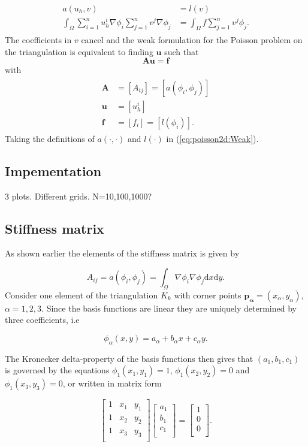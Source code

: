 \documentclass[paper=a4, fontsize=11pt]{scrartcl} %
\begin{document}
\begin{eqnarray}
\begin{aligned}
\nonumber
a(u_h,v) &= l(v) \\
\int_{\Omega}\sum\limits_{i=1}^n u^i_h\nabla\phi_i\sum\limits_{j=1}^n v^j\nabla\phi_j &= \int_{\Omega}f\sum\limits_{j=1}^n v^j\phi_j.
\end{aligned}
\end{eqnarray}
The coefficients in $v$ cancel and the weak formulation for the Poisson problem on the triangulation is equivalent to finding $\mathbf{u}$ such that
\[\mathbf{Au}=\mathbf{f}\]  
with
\begin{eqnarray}
\begin{aligned}
\nonumber
\mathbf{A} &= [A_{ij}]=[a(\phi_i,\phi_j)]\\
\mathbf{u} &= [u_{h}^i] \\
\mathbf{f} &= [f_i]=[l(\phi_i)].
\end{aligned}
\end{eqnarray}
Taking the definitions of $a(\cdot,\cdot)$ and $l(\cdot)$ in (\ref{eq:poisson2d:Weak}).

\subsection{Impementation}
3 plots. Different grids. N=10,100,1000?
\subsection{Stiffness matrix}
As shown earlier the elements of the stiffness matrix is given by

\[ A_{ij} = a(\phi_i,\phi_j)=\int_{\Omega} \nabla \phi_i \nabla \phi_j \mathrm{d}x\mathrm{d}y.\] 
Consider one element of the triangulation $K_k$ with corner points $\mathbf{p_\alpha}=(x_\alpha,y_\alpha)$, $\alpha=1,2,3$. Since the basis functions are linear they are uniquely determined by three coefficients, i.e

\[\phi_\alpha(x,y) = a_\alpha +b_\alpha x+c_\alpha y.\]

The Kronecker delta-property of the basis functions then gives that $(a_1, b_1,c_1)$ is governed by the equations $\phi_1(x_1,y_1)=1$, $\phi_1(x_2,y_2)=0$ and $\phi_1(x_3,y_3)=0$, or written in matrix form

\begin{equation}
\begin{bmatrix}
  1 & x_1 & y_1\\
  1 & x_2 & y_2\\
  1 & x_3 & y_3\\\end{bmatrix}
\begin{bmatrix} a_1 \\ b_1\\ c_1 \\ \end{bmatrix} =
\begin{bmatrix}
  1 \\ 0\\ 0 \\
\end{bmatrix}.
\label{eq:poisson2d:C-matrix}
\end{equation}
\end{document}
